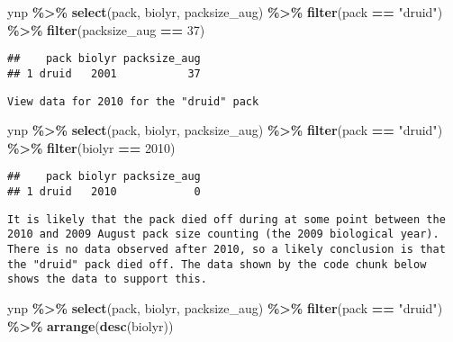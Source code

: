 \documentclass[
]{article}
\newenvironment{Shaded}{\begin{snugshade}}{\end{snugshade}}
\newcommand{\DecValTok}[1]{\textcolor[rgb]{0.00,0.00,0.81}{#1}}
\newcommand{\FunctionTok}[1]{\textcolor[rgb]{0.13,0.29,0.53}{\textbf{#1}}}
\newcommand{\NormalTok}[1]{#1}
\newcommand{\SpecialCharTok}[1]{\textcolor[rgb]{0.81,0.36,0.00}{\textbf{#1}}}
\newcommand{\StringTok}[1]{\textcolor[rgb]{0.31,0.60,0.02}{#1}}
\begin{document}
\begin{Shaded}
\begin{Highlighting}[]
\NormalTok{ynp }\SpecialCharTok{\%\textgreater{}\%}
  \FunctionTok{select}\NormalTok{(pack, biolyr, packsize\_aug) }\SpecialCharTok{\%\textgreater{}\%}
  \FunctionTok{filter}\NormalTok{(pack }\SpecialCharTok{==} \StringTok{"druid"}\NormalTok{) }\SpecialCharTok{\%\textgreater{}\%}
  \FunctionTok{filter}\NormalTok{(packsize\_aug }\SpecialCharTok{==} \DecValTok{37}\NormalTok{)}
\end{Highlighting}
\end{Shaded}

\begin{verbatim}
##    pack biolyr packsize_aug
## 1 druid   2001           37
\end{verbatim}

\begin{verbatim}
View data for 2010 for the "druid" pack
\end{verbatim}

\begin{Shaded}
\begin{Highlighting}[]
\NormalTok{ynp }\SpecialCharTok{\%\textgreater{}\%}
  \FunctionTok{select}\NormalTok{(pack, biolyr, packsize\_aug) }\SpecialCharTok{\%\textgreater{}\%}
  \FunctionTok{filter}\NormalTok{(pack }\SpecialCharTok{==} \StringTok{"druid"}\NormalTok{) }\SpecialCharTok{\%\textgreater{}\%}
  \FunctionTok{filter}\NormalTok{(biolyr }\SpecialCharTok{==} \DecValTok{2010}\NormalTok{)}
\end{Highlighting}
\end{Shaded}

\begin{verbatim}
##    pack biolyr packsize_aug
## 1 druid   2010            0
\end{verbatim}

\begin{verbatim}
It is likely that the pack died off during at some point between the 2010 and 2009 August pack size counting (the 2009 biological year). There is no data observed after 2010, so a likely conclusion is that the "druid" pack died off. The data shown by the code chunk below shows the data to support this.
\end{verbatim}

\begin{Shaded}
\begin{Highlighting}[]
\NormalTok{ynp }\SpecialCharTok{\%\textgreater{}\%}
  \FunctionTok{select}\NormalTok{(pack, biolyr, packsize\_aug) }\SpecialCharTok{\%\textgreater{}\%}
  \FunctionTok{filter}\NormalTok{(pack }\SpecialCharTok{==} \StringTok{"druid"}\NormalTok{) }\SpecialCharTok{\%\textgreater{}\%}
  \FunctionTok{arrange}\NormalTok{(}\FunctionTok{desc}\NormalTok{(biolyr))}
\end{Highlighting}
\end{Shaded}
\end{document}
